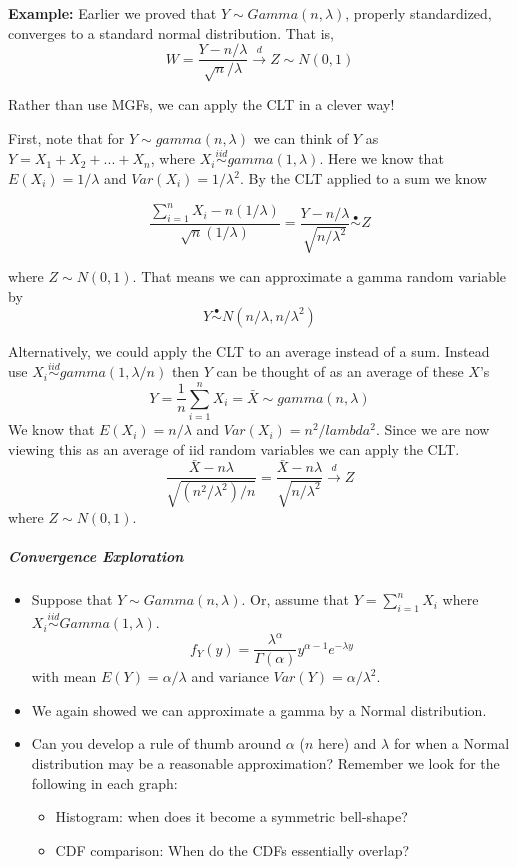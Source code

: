 \documentclass[
]{article}
\providecommand{\tightlist}{%
  \setlength{\itemsep}{0pt}\setlength{\parskip}{0pt}}
\begin{document}
\textbf{Example:} Earlier we proved that \(Y\sim Gamma(n, \lambda)\),
properly standardized, converges to a standard normal distribution. That
is,
\[W = \frac{Y-n/\lambda}{\sqrt{n}/\lambda}\stackrel{d}{\rightarrow} Z \sim N(0,1)\]

Rather than use MGFs, we can apply the CLT in a clever way!

First, note that for \(Y\sim gamma(n,\lambda)\) we can think of \(Y\) as
\(Y=X_1+X_2+...+X_{n}\), where
\(X_i\stackrel{iid}\sim gamma(1,\lambda)\). Here we know that
\(E(X_i) = 1/\lambda\) and \(Var(X_i) = 1/\lambda^2\). By the CLT
applied to a sum we know

\[\frac{\sum_{i=1}^{n} X_i -n(1/\lambda)}{\sqrt{n}(1/\lambda)} = \frac{Y-n/\lambda}{\sqrt{n/\lambda^2}}\stackrel{\bullet}{\sim}Z\]

where \(Z\sim N(0,1)\). That means we can approximate a gamma random
variable by \[Y \stackrel{\bullet}{\sim} N(n/\lambda, n/\lambda^2)\]

Alternatively, we could apply the CLT to an average instead of a sum.
Instead use \(X_i\stackrel{iid}{\sim}gamma(1,\lambda/n)\) then \(Y\) can
be thought of as an average of these \(X\)'s
\[Y=\frac{1}{n}\sum_{i=1}^{n}X_i=\bar{X}\sim gamma(n,\lambda)\] We know
that \(E(X_i) = n/\lambda\) and \(Var(X_i) = n^2/lambda^2\). Since we
are now viewing this as an average of iid random variables we can apply
the CLT.\\
\[\frac{\bar{X}-n\lambda}{\sqrt{(n^2/\lambda^2)/n}}=\frac{\bar{X}-n\lambda}{\sqrt{n/\lambda^2}}\stackrel{d}\rightarrow Z\]
where \(Z\sim N(0,1)\).

\hypertarget{convergence-exploration}{%
\subparagraph{Convergence Exploration}\label{convergence-exploration}}

\begin{itemize}
\tightlist
\item
  Suppose that \(Y \sim Gamma(n, \lambda)\). Or, assume that
  \(Y = \sum_{i=1}^{n} X_i\) where
  \(X_i\stackrel{iid}\sim Gamma(1, \lambda)\).
  \[f_Y(y) = \frac{\lambda^\alpha}{\Gamma(\alpha)}y^{\alpha -1}e^{-\lambda y}\]
  with mean \(E(Y) = \alpha/\lambda\) and variance
  \(Var(Y) = \alpha/\lambda^2\).
\item
  We again showed we can approximate a gamma by a Normal distribution.\\
\item
  Can you develop a rule of thumb around \(\alpha\) (\(n\) here) and
  \(\lambda\) for when a Normal distribution may be a reasonable
  approximation? Remember we look for the following in each graph:

  \begin{itemize}
  \tightlist
  \item
    Histogram: when does it become a symmetric bell-shape?
  \item
    CDF comparison: When do the CDFs essentially overlap?
  \end{itemize}
\end{itemize}
\end{document}

